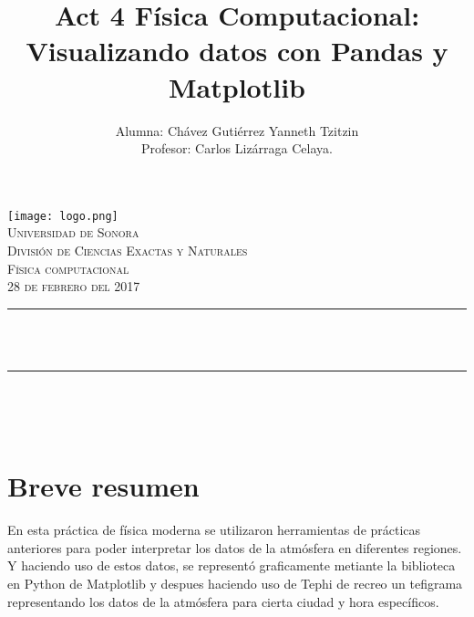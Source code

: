 \documentclass[12pt]{article}
\title{Act 4 Física Computacional:\\Visualizando datos con Pandas y Matplotlib} %
\author {Alumna: Chávez Gutiérrez Yanneth Tzitzin \\ Profesor: Carlos Lizárraga Celaya. }											%
\makeatletter
\let\thetitle\@title
\let\theauthor\@author
\makeatother
\begin{document}

\begin{titlepage}
	\centering
    \vspace*{0.5 cm}
\texttt{[image: logo.png]}\\%
    \textsc{\Large Universidad de Sonora}\\[1.0 cm]	%
	\textsc{\Large División de Ciencias Exactas y Naturales}\\[0.5 cm]				%
	\textsc{\large Física computacional}\\[0.5 cm]
   \textsc {28 de febrero del 2017} 	
\rule{\linewidth}{0.2 mm} \\[0.4 cm]
	{ \huge \bfseries \thetitle}\\
	\rule{\linewidth}{0.2 mm} \\[0.5 cm]
	
	\begin{minipage}{\textwidth}
		\begin{flushleft} 
        \begin{center}
			\theauthor
             \end{center}
			\end{flushleft}
	\end{minipage}\\[1 cm]
	
 
	\vfill
	
\end{titlepage}
\pagebreak



\section{Breve resumen}
En esta práctica de física moderna se utilizaron herramientas de prácticas anteriores para poder interpretar los datos de la atmósfera en diferentes regiones. Y haciendo uso de estos datos, se representó graficamente metiante la biblioteca en Python de Matplotlib y despues haciendo uso de Tephi de recreo un tefigrama representando los datos de la atmósfera para cierta ciudad y hora específicos.
\end{document}
